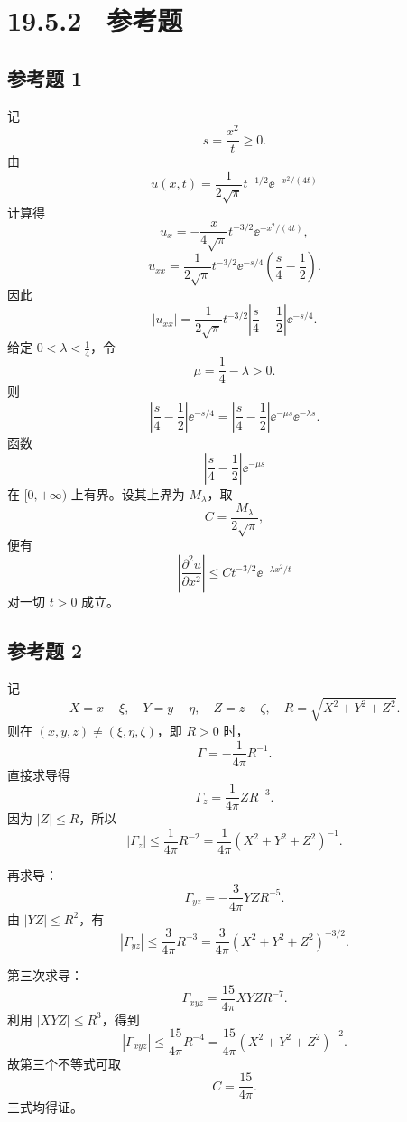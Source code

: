 \section*{19.5.2　参考题}

\subsection*{参考题 1}
\begin{xsolution}
记
\[
  s=\frac{x^2}{t}\ge0.
\]
由
\[
  u(x,t)=\frac1{2\sqrt\pi}t^{-1/2}\ee^{-x^2/(4t)}
\]
计算得
\[
  u_x=-\frac{x}{4\sqrt\pi}t^{-3/2}\ee^{-x^2/(4t)},
\]
\[
  u_{xx}
  =\frac1{2\sqrt\pi}t^{-3/2}\ee^{-s/4}
    \left(\frac{s}{4}-\frac12\right).
\]
因此
\[
  |u_{xx}|
  =\frac1{2\sqrt\pi}t^{-3/2}
    \left|\frac{s}{4}-\frac12\right|\ee^{-s/4}.
\]
给定 $0<\lambda<\frac14$，令
\[
  \mu=\frac14-\lambda>0.
\]
则
\[
  \left|\frac{s}{4}-\frac12\right|\ee^{-s/4}
  =\left|\frac{s}{4}-\frac12\right|\ee^{-\mu s}\ee^{-\lambda s}.
\]
函数
\[
  \left|\frac{s}{4}-\frac12\right|\ee^{-\mu s}
\]
在 $[0,+\infty)$ 上有界。设其上界为 $M_\lambda$，取
\[
  C=\frac{M_\lambda}{2\sqrt\pi},
\]
便有
\[
  \boxed{
  \left|\frac{\partial^2u}{\partial x^2}\right|
  \le Ct^{-3/2}\ee^{-\lambda x^2/t}}
\]
对一切 $t>0$ 成立。
\end{xsolution}

\subsection*{参考题 2}
\begin{xsolution}
记
\[
  X=x-\xi,
  \quad Y=y-\eta,
  \quad Z=z-\zeta,
  \quad R=\sqrt{X^2+Y^2+Z^2}.
\]
则在 $(x,y,z)\ne(\xi,\eta,\zeta)$，即 $R>0$ 时，
\[
  \Gamma=-\frac1{4\pi}R^{-1}.
\]
直接求导得
\[
  \Gamma_z=\frac1{4\pi}ZR^{-3}.
\]
因为 $|Z|\le R$，所以
\[
  |\Gamma_z|
  \le\frac1{4\pi}R^{-2}
  =\frac1{4\pi}(X^2+Y^2+Z^2)^{-1}.
\]

再求导：
\[
  \Gamma_{yz}
  =-\frac3{4\pi}YZR^{-5}.
\]
由 $|YZ|\le R^2$，有
\[
  |\Gamma_{yz}|
  \le\frac3{4\pi}R^{-3}
  =\frac3{4\pi}(X^2+Y^2+Z^2)^{-3/2}.
\]

第三次求导：
\[
  \Gamma_{xyz}
  =\frac{15}{4\pi}XYZR^{-7}.
\]
利用 $|XYZ|\le R^3$，得到
\[
  |\Gamma_{xyz}|
  \le\frac{15}{4\pi}R^{-4}
  =\frac{15}{4\pi}(X^2+Y^2+Z^2)^{-2}.
\]
故第三个不等式可取
\[
  \boxed{C=\frac{15}{4\pi}}.
\]
三式均得证。
\end{xsolution}

